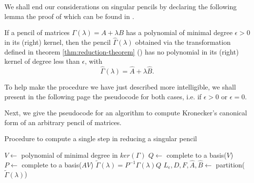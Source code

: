 We shall end our considerations on singular pencils by declaring the following lemma the proof of which can be
found in \cite[pp. 32-33]{gantmacher}.
\begin{lemma}
    If a pencil of matrices \(\Gamma(\lambda) = A + \lambda B\) has a polynomial of minimal degree \(\epsilon > 0\)
    in its (right) kernel, then the pencil \(\widehat{\Gamma}(\lambda)\)
    obtained via the transformation defined in theorem \ref{thm:reduction-theorem}
    () has no polynomial in its (right)
    kernel of degree less than \(\epsilon\), with
    \[
        \widehat{\Gamma}(\lambda) = \widehat{A} + \lambda\widehat{B}.
    \]
\end{lemma}
To help make the procedure we have just described more intelligible, we shall present in the following page the
pseudocode for both cases, i.e. if $\epsilon > 0$ or $\epsilon = 0$.

Next, we give the pseudocode for an algorithm to compute Kronecker's canonical form of
an arbitrary pencil of matrices.

\pagebreak

\begin{algorithm}[!h]\label{alg:kcf-singular}
    \caption{Procedure to compute a single step in reducing a singular pencil}
    $V \gets $ polynomial of minimal degree in $ker(\Gamma)$\;
    $Q \gets $ complete to a basis($V$)\;
    $P \gets $ complete to a basis($AV$)\;
    $\tilde{\Gamma}(\lambda) = P^{-1}\Gamma(\lambda)Q$\;
    $L_{\epsilon}, D, F, \widehat{A}, \widehat{B} \gets $ partition($\tilde{\Gamma}(\lambda)$)\;
    {
        \;
    }
\end{algorithm}

